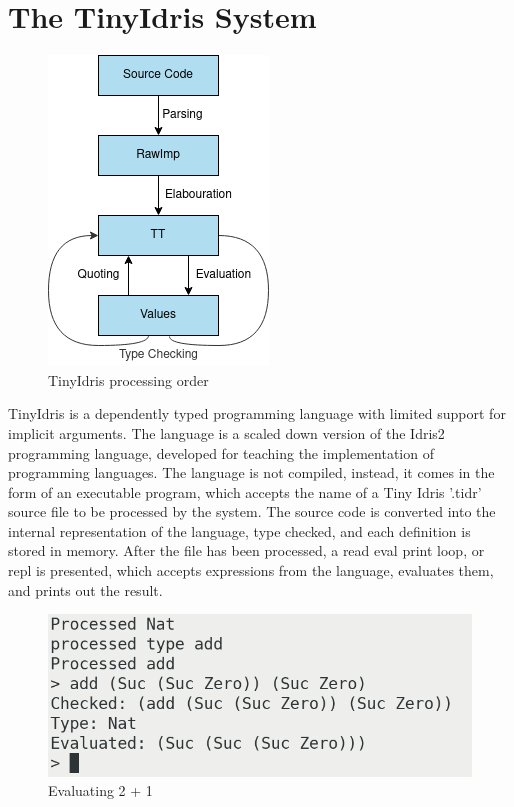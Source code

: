 \documentclass[a4paper]{article}
\begin{document}
\clearpage

\section{The TinyIdris System}
\label{sec:org2a24981}

\begin{center}
\begin{figure}[htbp]
\centering
\includegraphics[scale=0.60]{./Resource/main.png}
\caption{TinyIdris processing order}
\end{figure}
\end{center}

TinyIdris is a dependently typed programming language with limited support
for implicit arguments. The language is a scaled down version of the 
Idris2 programming language, developed for teaching the implementation
of programming languages. The language is not compiled, instead, it comes
in the form of an executable program, which accepts the name of a 
Tiny Idris '.tidr' source file to be processed by the system.
The source code is converted into the internal representation of
the language, type checked, and each definition is stored in
memory. After the file has been processed, a read eval print loop, or 
repl is presented, which accepts expressions from the language,
evaluates them, and prints out the result.

\begin{center}
\begin{figure}[htbp]
\centering
\includegraphics[scale=0.35]{./Resource/addEval.png}
\caption{Evaluating 2 + 1}
\end{figure}
\end{center}
\end{document}
